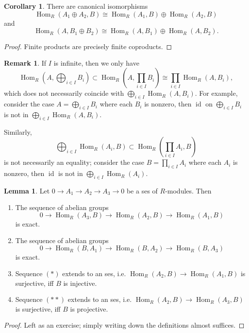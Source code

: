 \documentclass{article}
\newcommand{\id}{\operatorname{id}}
\newcommand{\Hom}{\operatorname{Hom}}
\theoremstyle{definition}
\newtheorem{lemma}[defn]{Lemma}
\newtheorem{coro}[defn]{Corollary}
\newtheorem{remark}[defn]{Remark}
\begin{document}
\begin{coro}
There are canonical isomorphisms
\[
\Hom_R(A_1\oplus A_2,B)\cong\Hom_R(A_1,B)\oplus\Hom_R(A_2,B)
\]
and
\[
\Hom_R(A,B_1\oplus B_2)\cong\Hom_R(A,B_1)\oplus\Hom_R(A,B_2).
\]
\end{coro}
\begin{proof}
Finite products are precisely finite coproducts.
\end{proof}

\begin{remark}
If $I$ is infinite, then we only have
\[
\Hom_R\left(A,\bigoplus_{i\in I}B_i\right)\subset\Hom_R\left(A,\prod_{i\in I}B_i\right)\cong\prod_{i\in I}\Hom_R(A,B_i),
\]
which does not necessarily coincide with $\bigoplus_{i\in I}\Hom_R(A,B_i)$. For example, consider the case $A=\bigoplus_{i\in I}B_i$ where each $B_i$ is nonzero, then $\id$ on $\bigoplus_{i\in I}B_i$ is not in $\bigoplus_{i\in I}\Hom_R(A,B_i)$.

Similarly,
\[
\bigoplus_{i\in I}\Hom_R(A_i,B)\subset\Hom_R\left(\prod_{i\in I}A_i,B\right)
\]
is not necessarily an equality; consider the case $B=\prod_{i\in I}A_i$ where each $A_i$ is nonzero, then $\id$ is not in $\bigoplus_{i\in I}\Hom_R(A_i)$.
\end{remark}

\begin{lemma}
\label{lemma:charofprojinjbyHom}
Let $0\rightarrow A_1\rightarrow A_2\rightarrow A_3\rightarrow 0$ be a ses of $R$-modules. Then
\begin{enumerate}
\item The sequence of abelian groups
\[
\tag{\ast}
0\rightarrow\Hom_R(A_3,B)\rightarrow\Hom_R(A_2,B)\rightarrow\Hom_R(A_1,B)
\]
is exact.
\item The sequence of abelian groups
\[
\tag{\ast\ast}
0\rightarrow\Hom_R(B,A_1)\rightarrow\Hom_R(B,A_2)\rightarrow\Hom_R(B,A_3)
\]
is exact.
\item Sequence $(\ast)$ extends to an ses, i.e. $\Hom_R(A_2,B)\rightarrow\Hom_R(A_1,B)$ is surjective, iff $B$ is injective.
\item Sequence $(\ast\ast)$ extends to an ses, i.e. $\Hom_R(A_2,B)\rightarrow\Hom_R(A_3,B)$ is surjective, iff $B$ is projective.
\end{enumerate}
\end{lemma}
\begin{proof}
Left as an exercise; simply writing down the definitions almost suffices.
\end{proof}
\end{document}
